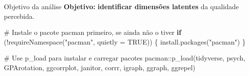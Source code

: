 \documentclass[
  ignorenonframetext,
  aspectratio=169,
]{beamer}
\newenvironment{Shaded}{\begin{snugshade}}{\end{snugshade}}
\newcommand{\AttributeTok}[1]{\textcolor[rgb]{0.40,0.45,0.13}{#1}}
\newcommand{\CommentTok}[1]{\textcolor[rgb]{0.37,0.37,0.37}{#1}}
\newcommand{\ConstantTok}[1]{\textcolor[rgb]{0.56,0.35,0.01}{#1}}
\newcommand{\ControlFlowTok}[1]{\textcolor[rgb]{0.00,0.23,0.31}{\textbf{#1}}}
\newcommand{\FunctionTok}[1]{\textcolor[rgb]{0.28,0.35,0.67}{#1}}
\newcommand{\NormalTok}[1]{\textcolor[rgb]{0.00,0.23,0.31}{#1}}
\newcommand{\SpecialCharTok}[1]{\textcolor[rgb]{0.37,0.37,0.37}{#1}}
\newcommand{\StringTok}[1]{\textcolor[rgb]{0.13,0.47,0.30}{#1}}
\begin{document}
\begin{frame}[fragile]{Objetivo da análise}
\label{objetivo-da-anuxe1lise}
\textbf{Objetivo:} \textbf{identificar dimensões latentes} da qualidade
percebida.

\pause

\begin{Shaded}
\begin{Highlighting}[]
\CommentTok{\# Instale o pacote pacman primeiro, se ainda não o tiver}
\ControlFlowTok{if}\NormalTok{ (}\SpecialCharTok{!}\FunctionTok{requireNamespace}\NormalTok{(}\StringTok{"pacman"}\NormalTok{, }\AttributeTok{quietly =} \ConstantTok{TRUE}\NormalTok{)) \{}
  \FunctionTok{install.packages}\NormalTok{(}\StringTok{"pacman"}\NormalTok{)}
\NormalTok{\}}

\CommentTok{\# Use p\_load para instalar e carregar pacotes}
\NormalTok{pacman}\SpecialCharTok{::}\FunctionTok{p\_load}\NormalTok{(tidyverse, psych, GPArotation, ggcorrplot, janitor, corrr, igraph, ggraph, ggrepel)}
\end{Highlighting}
\end{Shaded}
\end{frame}
\end{document}

